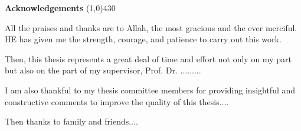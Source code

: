 \begin{center}
{\huge \bf Acknowledgements}
\line(1,0){430}
\end{center}

\begin{flushleft}

All the praises and thanks are to Allah, the most gracious and the ever merciful. HE has given me the strength, courage, and patience to carry out this work. 

\vspace{0.3cm}

Then, this thesis represents a great deal of time and effort not only on my part but also on the part of my supervisor, Prof. Dr. .........

\vspace{0.3cm}

I am also thankful to my thesis committee members for providing insightful and constructive comments to improve the quality of this thesis....

\vspace{0.3cm}

Then thanks to family and friends....  

\end{flushleft}